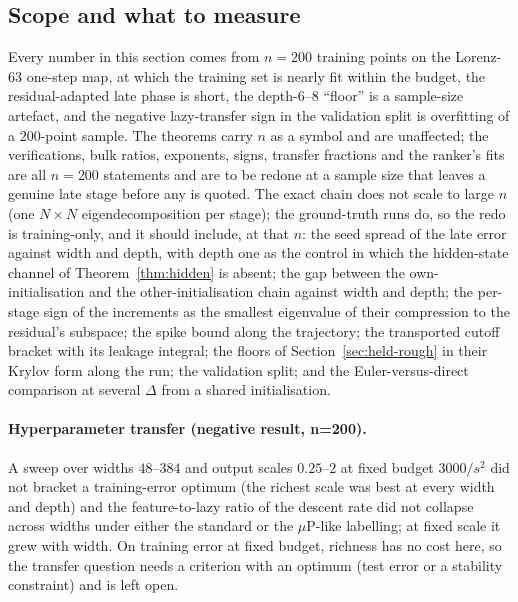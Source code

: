 \subsection{Scope and what to measure}
\label{ssec:chain-scope}

Every number in this section comes from $n=200$ training points on the
Lorenz-63 one-step map, at which the training set is nearly fit within the
budget, the residual-adapted late phase is short, the depth-$6$--$8$ ``floor'' is a
sample-size artefact, and the negative lazy-transfer sign in the validation
split is overfitting of a $200$-point sample. The theorems carry $n$ as a symbol
and are unaffected; the verifications, bulk ratios, exponents, signs, transfer
fractions and the ranker's fits are all $n=200$ statements and are to be redone
at a sample size that leaves a genuine late stage before any is quoted. The
exact chain does not scale to large $n$ (one $N\times N$ eigendecomposition per
stage); the ground-truth runs do, so the redo is training-only, and it should
include, at that $n$: the seed spread of the late error against width and
depth, with depth one as the control in which the hidden-state channel of
Theorem~\ref{thm:hidden} is absent; the gap between the own-initialisation and the other-initialisation
chain against width and depth; the per-stage sign of the increments as the
smallest eigenvalue of their compression to the residual's subspace; the spike bound along
the trajectory; the transported cutoff bracket with its leakage integral; the
floors of Section~\ref{sec:held-rough} in their Krylov form along the run; the validation split; and the Euler-versus-direct comparison
at several $\Delta$ from a shared initialisation.

\paragraph{Hyperparameter transfer (negative result, n=200).} A sweep over widths
$48$--$384$ and output scales $0.25$--$2$ at fixed budget $3000/s^2$ did not
bracket a training-error optimum (the richest scale was best at every width and
depth) and the feature-to-lazy ratio of the descent rate did not collapse across
widths under either the standard or the $\mu$P-like labelling; at fixed scale it
grew with width. On training error at fixed budget, richness has no cost here,
so the transfer question needs a criterion with an optimum (test error or a
stability constraint) and is left open.
